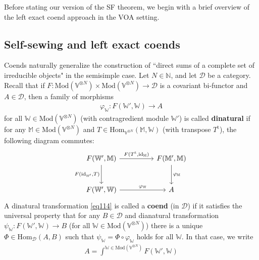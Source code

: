 \documentclass[11pt,b5paper,notitlepage]{article}
\theoremstyle{definition}
\theoremstyle{plain}
\newcommand{\tr}{\mathrm{t}} %
\newcommand{\Hom}{\mathrm{Hom}}
\newcommand{\scr}{\mathscr}
\newcommand{\Vbb}{\mathbb V}
\newcommand{\Wbb}{\mathbb W}
\newcommand{\Mbb}{\mathbb M}
\newcommand{\Nbb}{\mathbb N}
\newcommand{\<}{\left\langle}
\renewcommand{\>}{\right\rangle}
\newcommand{\Mod}{\mathrm{Mod}}
\newcommand{\id}{\mathrm{id}}
\numberwithin{equation}{section}
\begin{document}
Before stating our version of the SF theorem, we begin with a brief overview of the left exact coend approach in the VOA setting.





\subsection{Self-sewing and left exact coends}\label{lb56}




Coends naturally generalize the construction of ``direct sums of a complete set of irreducible objects" in the semisimple case. Let $N\in\Nbb$, and let $\scr D$ be a category.  Recall that if $F:\Mod(\Vbb^{\otimes N})\times \Mod(\Vbb^{\otimes N})\rightarrow\scr D$ is a covariant bi-functor and $A\in\scr D$,  then a family of morphisms
\begin{align}\label{eq114}
\varphi_\Wbb:F(\Wbb', \Wbb)\rightarrow A
\end{align}
for all $\Wbb\in\Mod(\Vbb^{\otimes N})$ (with contragredient module $\Wbb'$) is called \textbf{dinatural} if for any $\Mbb\in\Mod(\Vbb^{\otimes N})$ and $T\in\Hom_{\Vbb^{\otimes N}}(\Mbb,\Wbb)$ (with transpose $T^\tr$), the following diagram commutes:
\begin{equation*}
\begin{tikzcd}[row sep=large, column sep=huge]
F(\Wbb',\Mbb) \arrow[r,"{F(T^\tr,\id_\Mbb)}"] \arrow[d,"{F(\id_{\Wbb'},T)}"'] & F(\Mbb',\Mbb) \arrow[d,"\varphi_\Mbb"] \\
F(\Wbb',\Wbb) \arrow[r,"\varphi_\Wbb"]           & A         
\end{tikzcd}
\end{equation*}
A dinatural transformation \eqref{eq114} is called a \textbf{coend} (in $\scr D$) if it satisfies the universal property that for any $B\in\scr D$ and dianatural transformation $\psi_\Wbb:F(\Wbb',\Wbb)\rightarrow B$ (for all $\Wbb\in\Mod(\Vbb^{\otimes N})$) there is a unique $\Phi\in\Hom_{\scr D}(A,B)$ such that $\psi_\Wbb=\Phi\circ\varphi_\Wbb$ holds for all $\Wbb$. In that case, we write
\begin{align*}
A=\int^{\Wbb\in\Mod(\Vbb^{\otimes N})}F(\Wbb',\Wbb)
\end{align*}
\end{document}
